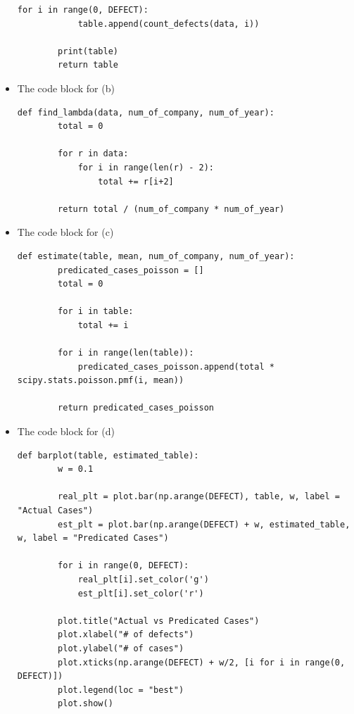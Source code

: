 \documentclass[a4 paper]{article}
\numberwithin{equation}{section}
\newcommand{\0}{\mathbf{0}}
\begin{document}
\begin{itemize}
\begin{lstlisting}[label={list:first},caption=The code block a - Compute the values in Table 1 and Print table]
        for i in range(0, DEFECT):
            table.append(count_defects(data, i))
        
        print(table)
        return table
    \end{lstlisting}
	
	\item The code block for (b)\\
	\begin{lstlisting}[label={list:first},caption=The code block b - Compute Lambda]
	def find_lambda(data, num_of_company, num_of_year):
        total = 0
        
        for r in data:
            for i in range(len(r) - 2):
                total += r[i+2]
    
        return total / (num_of_company * num_of_year)
    \end{lstlisting}
	
	\item The code block for (c)\\
	\begin{lstlisting}[label={list:first},caption=The code block c - Compute the values in Table 2 and Print table]
    	def estimate(table, mean, num_of_company, num_of_year):
        predicated_cases_poisson = []
        total = 0
    
        for i in table:
            total += i
    
        for i in range(len(table)):
            predicated_cases_poisson.append(total * scipy.stats.poisson.pmf(i, mean))
    
        return predicated_cases_poisson
    \end{lstlisting}
	
	\item The code block for (d)\\
	\begin{lstlisting}[label={list:first},caption=The code block d - Draw the barplot]
	def barplot(table, estimated_table):
        w = 0.1
        
        real_plt = plot.bar(np.arange(DEFECT), table, w, label = "Actual Cases")
        est_plt = plot.bar(np.arange(DEFECT) + w, estimated_table, w, label = "Predicated Cases")
    
        for i in range(0, DEFECT):
            real_plt[i].set_color('g')
            est_plt[i].set_color('r')
    
        plot.title("Actual vs Predicated Cases")
        plot.xlabel("# of defects")
        plot.ylabel("# of cases")
        plot.xticks(np.arange(DEFECT) + w/2, [i for i in range(0, DEFECT)])
        plot.legend(loc = "best")
        plot.show()
    \end{lstlisting}
    \end{itemize}
\end{document}
